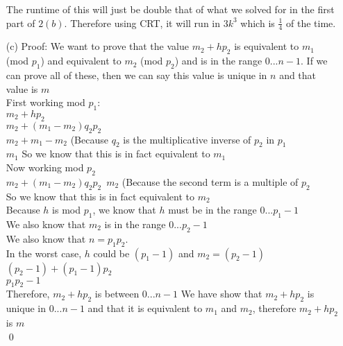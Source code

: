 \documentclass[11pt]{article}
\theoremstyle{definition}
\begin{document}
\begin{enumerate}
The runtime of this will just be double that of what we solved for in the first part of $2(b)$.  Therefore using CRT, it will run in $3k^3$ which is $\frac{1}{4}$ of the time.\\

\item[(c)]
Proof: We want to prove that the value $m_2 + hp_2$ is equivalent to $m_1$ (mod $p_1$) and equivalent to $m_2$ (mod $p_2$) and is in the range $0...n-1$.  If we can prove all of these, then we can say this value is unique in $n$ and that value is $m$\\
First working mod $p_1$:\\
$m_2 + hp_2$\\
$m_2 + (m_1-m_2)q_2p_2$\\
$m_2 + m_1 - m_2$ (Because $q_2$ is the multiplicative inverse of $p_2$ in $p_1$\\
$m_1$ So we know that this is in fact equivalent to $m_1$\\
\newline
Now working mod $p_2$\\
$m_2 + (m_1-m_2)q_2p_2$\
$m_2$ (Because the second term is a multiple of $p_2$\\
So we know that this is in fact equivalent to $m_2$\\
\newline
Because $h$ is mod $p_1$, we know that $h$ must be in the range $0...p_1-1$\\
We also know that $m_2$ is in the range $0...p_2-1$\\
We also know that $n = p_1p_2$.\\
In the worst case, $h$ could be $(p_1-1)$ and $m_2 = (p_2-1)$\\
$(p_2-1) + (p_1-1)p_2$\\
$p_1p_2 - 1$\\
Therefore, $m_2 + hp_2$ is between $0...n-1$
We have show that $m_2 + hp_2$ is unique in $0...n-1$ and that it is equivalent to $m_1$ and $m_2$, therefore $m_2 + hp_2$ is $m$\\
\qed
\end{enumerate}
\end{document}
